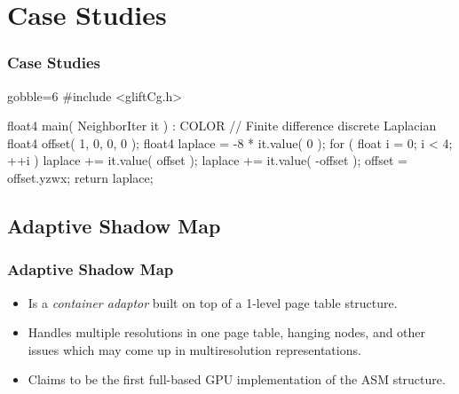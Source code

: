 \documentclass[xcolor={usenames,dvipsnames}]{beamer}
\begin{document}
\section{Case Studies}
\begin{frame}[fragile]
  \frametitle{Case Studies}

  \begin{overprint}
    \vspace{-5mm}
    \begin{ccode*}{gobble=6}
      #include <gliftCg.h>

      float4 main( NeighborIter it ) : COLOR
      {
        // Finite difference discrete Laplacian
        float4 offset( 1, 0, 0, 0 );
        float4 laplace = -8 * it.value( 0 );
        for ( float i = 0; i < 4; ++i ) {
          laplace += it.value( offset );
          laplace += it.value( -offset );
          offset = offset.yzwx;
        }
        return laplace;
      }
    \end{ccode*}
  \end{overprint}
\end{frame}

\subsection{Adaptive Shadow Map}
\begin{frame}
  \frametitle{Adaptive Shadow Map}

  \begin{itemize}
  \item<2-> Is a \emph{container adaptor} built on top of a 1-level page table
    structure.
  \item<3-> Handles multiple resolutions in one page table, hanging nodes, and
    other issues which may come up in multiresolution representations.
  \item<4-> Claims to be the first full-based GPU implementation of the ASM
    structure.
  \end{itemize}
\end{frame}
\end{document}
